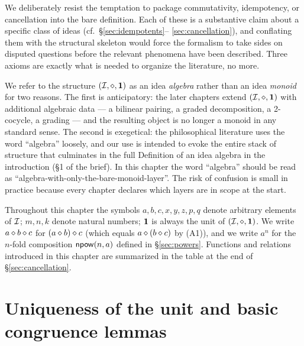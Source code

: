 \begin{remark}
We deliberately resist the temptation to package commutativity, idempotency,
or cancellation into the bare definition.  Each of these is a substantive
claim about a specific class of ideas (cf.\ \S\ref{sec:idempotents}--%
\ref{sec:cancellation}), and conflating them with the structural skeleton
would force the formalism to take sides on disputed questions before the
relevant phenomena have been described.  Three axioms are exactly what is
needed to organize the literature, no more.
\end{remark}

\begin{remark}
We refer to the structure $(\mathcal{I},\mathbin{\diamond},\mathbf{1})$ as an idea \emph{algebra} rather than
an idea \emph{monoid} for two reasons.  The first is anticipatory: the
later chapters extend $(\mathcal{I},\mathbin{\diamond},\mathbf{1})$ with additional algebraic data --- a
bilinear pairing, a graded decomposition, a 2-cocycle, a grading --- and
the resulting object is no longer a monoid in any standard sense.  The
second is exegetical: the philosophical literature uses the word
``algebra'' loosely, and our use is intended to evoke the entire stack
of structure that culminates in the full Definition of an idea algebra
in the introduction (\S 1 of the brief).  In this chapter the word
``algebra'' should be read as ``algebra-with-only-the-bare-monoid-layer''.
The risk of confusion is small in practice because every chapter declares
which layers are in scope at the start.
\end{remark}

\begin{notation}
Throughout this chapter the symbols $a, b, c, x, y, z, p, q$ denote
arbitrary elements of $\mathcal{I}$; $m, n, k$ denote natural numbers;
$\mathbf{1}$ is always the unit of $(\mathcal{I},\mathbin{\diamond},\mathbf{1})$.  We write $a \mathbin{\diamond} b \mathbin{\diamond} c$
for $(a \mathbin{\diamond} b) \mathbin{\diamond} c$ (which equals $a \mathbin{\diamond} (b \mathbin{\diamond} c)$
by (A1)), and we write $a^n$ for the $n$-fold composition $\mathsf{npow}(n,a)$
defined in \S\ref{sec:powers}.  Functions and relations introduced in this
chapter are summarized in the table at the end of \S\ref{sec:cancellation}.
\end{notation}

\section{Uniqueness of the unit and basic congruence lemmas}\label{sec:uniqueness}

